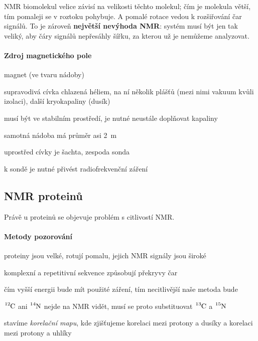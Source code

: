 \documentclass[DIV=8]{scrreprt}
\begin{document}
NMR biomolekul velice závisí na velikosti těchto molekul; čím je molekula větší, tím pomaleji se v roztoku pohybuje. A pomalé rotace vedou k rozšiřování čar signálů. To je zároveň \textbf{největší nevýhoda NMR}: systém musí být jen tak veliký, aby čáry signálů nepřesáhly šířku, za kterou už je nemůžeme analyzovat.

\paragraph{Zdroj magnetického pole}
\begin{myItemize}[nosep]
    \item magnet (ve tvaru nádoby)
    \item supravodivá cívka chlazená héliem, na ní několik plášťů (mezi nimi vakuum kvůli izolaci), další kryokapaliny (dusík)
\begin{myItemize}[nosep]
    \item musí být ve stabilním prostředí, je nutné neustále doplňovat kapaliny
\end{myItemize}

    \item samotná nádoba má průměr asi \si{2 m}
    \item uprostřed cívky je šachta, zespoda sonda
\begin{myItemize}[nosep]
    \item k sondě je nutné přivést radiofrekvenční záření
\end{myItemize}

\end{myItemize}



\subsection{NMR proteinů} \label{NMR proteinů}


Právě u proteinů se objevuje problém s citlivostí NMR.

\paragraph{Metody pozorování}
\begin{myItemize}[nosep]
    \item proteiny jsou velké, rotují pomalu, jejich NMR signály jsou široké
    \item komplexní a repetitivní sekvence způsobují překryvy čar
    \item čím vyšší energii bude mít použité záření, tím necitlivější naše metoda bude
    \item \(\ce{^12C}\) ani \(\ce{^14N}\) nejde na NMR vidět, musí se proto substituovat \(\ce{^13C}\) a \(\ce{^15N}\)
\begin{myItemize}[nosep]
    \item stavíme \emph{korelační mapu}, kde zjišťujeme korelaci mezi protony a dusíky a korelaci mezi protony a uhlíky
\end{myItemize}

\end{myItemize}
\end{document}
